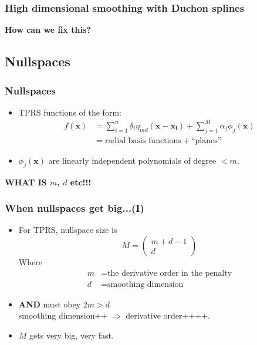 \documentclass[ignorenonframetext]{beamer} %
\newcommand{\bc}{\begin{center}}
\newcommand{\ec}{\end{center}}
\newcommand{\bi}{\begin{itemize}}
\newcommand{\ei}{\end{itemize}}
\begin{document}
\begin{frame}
	\frametitle{High dimensional smoothing with Duchon splines}
	\bc \textbf{How can we fix this?}\ec
\end{frame}



\subsection{Nullspaces}

\begin{frame}
	\frametitle{Nullspaces}
	\bi
		\item TPRS functions of the form:
		\begin{align*}
		f(\mathbf{x}) &= \sum_{i=1}^n \delta_i \eta_{md}(\mathbf{x}-\mathbf{x_i}) + \sum_{j=1}^M \alpha_j \phi_j(\mathbf{x})\\
		&= \text{radial basis functions} + \text{``planes''}
		\end{align*}
		\item $\phi_j(\mathbf{x})$ are linearly independent polynomials of degree $< m$.
	\ei
	\textbf{WHAT IS $m$, $d$ etc!!!}
\end{frame}


\begin{frame}
	\frametitle{When nullspaces get big...(I)}
	\bi
		\item For TPRS, nullspace size is 
		\begin{equation*}
			M=\begin{pmatrix} m+d-1 \\ d  \end{pmatrix}
		\end{equation*}
		Where \begin{align*}
				m &= \text{the derivative order in the penalty}\\
				d &= \text{smoothing dimension}
			\end{align*}
		\item \textbf{AND} must obey $2m>d$ \\smoothing dimension++ $\Rightarrow$ derivative order++++.
		\item $M$ gets very big, very fast.
	\ei
\end{frame}
\end{document}
